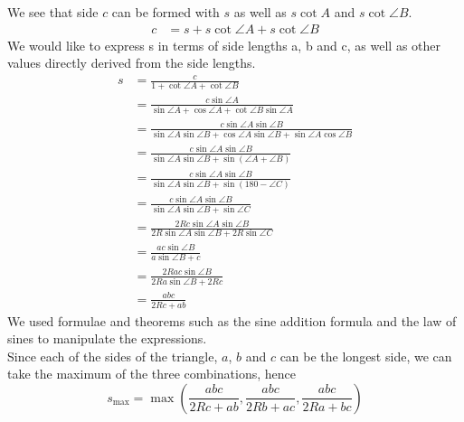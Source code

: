 \documentclass[12pt]{scrartcl}
\begin{document}
We see that side $c$ can be formed with $s$ as well as $s \cot A$ and $s \cot \angle B$.
\begin{align*}
	c & = s+s\cot \angle A+s\cot \angle B                                                                            
\end{align*}
We would like to express s in terms of side lengths a, b and c, as well as other values directly derived from the side lengths.
\begin{align*}
	s & = \frac{c}{1+\cot \angle A+\cot \angle B}                                                                      \\
	  & = \frac{c \sin\angle A}{\sin\angle A+\cos\angle A+\cot\angle B\sin\angle A}                                    \\
	  & = \frac{c\sin\angle A\sin\angle B}{\sin\angle A\sin\angle B+\cos\angle A\sin\angle B+\sin\angle A\cos\angle B} \\
	  & = \frac{c\sin\angle A\sin\angle B}{\sin\angle A\sin\angle B+\sin\left(\angle A+\angle B\right)}                \\
	  & = \frac{c\sin\angle A\sin\angle B}{\sin\angle A\sin\angle B+\sin\left(180-\angle C\right)}                     \\
	  & = \frac{c\sin\angle A\sin\angle B}{\sin\angle A\sin\angle B+\sin \angle C}                                     \\
	  & = \frac{2Rc\sin\angle A\sin\angle B}{2R\sin\angle A\sin \angle B+2R\sin \angle C}                              \\
	  & = \frac{ac\sin\angle B}{a\sin\angle B+c}                                                                       \\
	  & = \frac{2Rac\sin\angle B}{2Ra\sin\angle B+2Rc}                                                                 \\
	  & = \frac{abc}{2Rc+ab}                                                                                         
\end{align*}
We used formulae and theorems such as the sine addition formula and the law of sines to manipulate the expressions. \\

Since each of the sides of the triangle, $a$, $b$ and $c$ can be the longest side,
we can take the maximum of the three combinations, hence
\begin{equation}
	s_{\text{max}} = \max\left(\dfrac{abc}{2Rc+ab},\dfrac{abc}{2Rb+ac},\dfrac{abc}{2Ra+bc}\right)
\end{equation}
\end{document}
